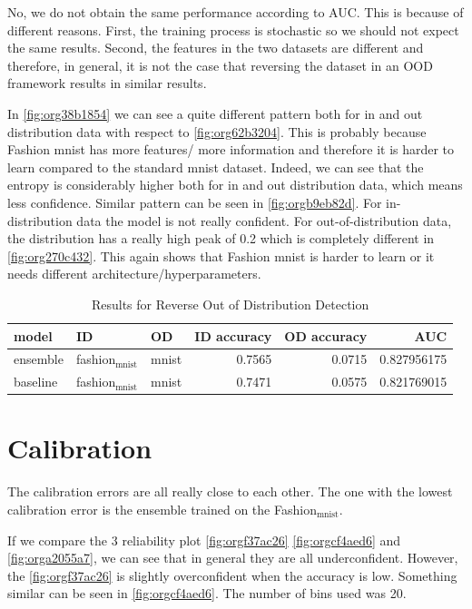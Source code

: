 \documentclass[11pt]{article}
\begin{document}
No, we do not obtain the same performance according to AUC. This is
because of different reasons. First, the training process is stochastic
so we should not expect the same results. Second, the features in the
two datasets are different and therefore, in general, it is not the
case that reversing the dataset in an OOD framework results in similar results.

In \ref{fig:org38b1854} we can see a quite different pattern both for in
and out distribution data with respect to \ref{fig:org62b3204}.
This is probably because Fashion mnist has more features/ more
information and therefore it is harder to learn compared to the
standard mnist dataset. Indeed, we can see that the entropy is
considerably higher both for in and out distribution data, which means
less confidence.
Similar pattern can be seen in \ref{fig:orgb9eb82d}. For in-distribution
data the model is not really confident. For out-of-distribution data,
the distribution has a really high peak of 0.2 which is completely
different in \ref{fig:org270c432}.
This again shows that Fashion mnist is harder to learn or it needs
different architecture/hyperparameters.


\begin{table}[htbp]
\caption{\label{tab:orgb97d2ed}
Results for Reverse Out of Distribution Detection}
\centering
\begin{tabular}{lllrrr}
\hline
model & ID & OD & ID accuracy & OD accuracy & AUC\\
\hline
ensemble & fashion\(_{\text{mnist}}\) & mnist & 0.7565 & 0.0715 & 0.827956175\\
\hline
baseline & fashion\(_{\text{mnist}}\) & mnist & 0.7471 & 0.0575 & 0.821769015\\
\hline
\end{tabular}
\end{table}

\section{Calibration}
\label{sec:orgf433c58}

The calibration errors are all really close to each other. The one
with the lowest calibration error is the ensemble trained on the
Fashion\(_{\text{mnist}}\).

If we compare the 3 reliability plot \ref{fig:orgf37ac26} \ref{fig:orgcf4aed6} and
\ref{fig:orga2055a7}, we can see that in general they are all
underconfident.
However, the \ref{fig:orgf37ac26} is slightly overconfident when the
accuracy is low.
Something similar can be seen in \ref{fig:orgcf4aed6}.
The number of bins used was 20.
\end{document}
